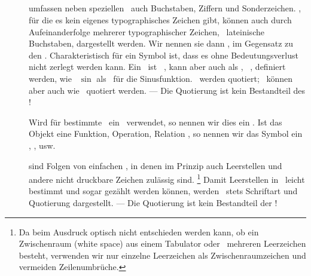 
\subsection[Bezeichnungen]{\Bezeichnungen}%
\label {sub:Bezeichnungen}

\begin{description}

	\item [\Symbole] umfassen neben speziellen \Symbolen\ auch Buchstaben, Ziffern und Sonderzeichen.
	\Symbole, für die es kein eigenes typographisches Zeichen gibt, können auch durch Aufeinanderfolge mehrerer typographischer Zeichen, \textiAlg\ lateinische Buchstaben, dargestellt werden.
	Wir nennen sie dann , im Gegensatz zu den .
	Charakteristisch für ein Symbol ist, dass es ohne Bedeutungsverlust nicht zerlegt werden kann.
	Ein \zusammengesetztesSymbol\ ist \textiAlg\ \zerlegbar, kann aber auch als \atomar, \textdh\ \unzerlegbar, definiert werden, wie \textzB\ $\sin$ als \Symbol\ für die Sinusfunktion.
	\Symbole\ werden  quotiert; \zerlegbare\ können aber auch wie \Symbolketten\ quotiert werden.
	--- Die Quotierung ist kein Bestandteil des \Symbols!

	Wird für bestimmte \Objekte\ ein \Symbol\ verwendet, so nennen wir dies ein .
	Ist das Objekt eine Funktion, Operation, Relation \textusw, so nennen wir das Symbol ein , ,  usw.

	\item [\Zeichenketten] sind Folgen von einfachen \Symbolen, in denen im Prinzip auch Leerstellen und andere nicht druckbare Zeichen zulässig sind.%
	\footnote{%
		Da beim Ausdruck optisch nicht entschieden werden kann, ob ein Zwischenraum (white space) aus einem Tabulator oder \textevtl\ mehreren Leerzeichen besteht, verwenden wir nur einzelne Leerzeichen als Zwischenraumzeichen und vermeiden Zeilenumbrüche.
	}
	Damit Leerstellen in \Zeichenketten\ leicht bestimmt und sogar gezählt werden können,
	werden \Zeichenketten\ stets  Schriftart und Quotierung dargestellt.
	--- Die Quotierung ist kein Bestandteil der \Zeichenkette!


\end{description}
